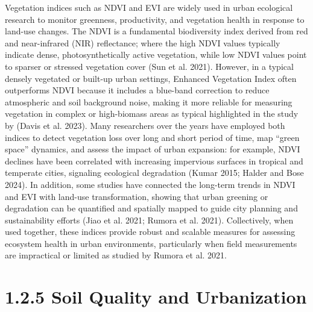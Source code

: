Vegetation indices such as NDVI and EVI are widely used in urban ecological research to monitor greenness, productivity, and vegetation health in response to land-use changes. The NDVI is a fundamental biodiversity index derived from red and near-infrared (NIR) reflectance; where the high NDVI values typically indicate dense, photosynthetically active vegetation, while low NDVI values point to sparser or stressed vegetation cover (Sun et al. 2021). However, in a typical densely vegetated or built-up urban settings, Enhanced Vegetation Index often outperforms NDVI because it includes a blue-band correction to reduce atmospheric and soil background noise, making it more reliable for measuring vegetation in complex or high-biomass areas as typical highlighted in the study by (Davis et al. 2023). Many researchers over the years have employed both indices to detect vegetation loss over long and short period of time, map ``green space'' dynamics, and assess the impact of urban expansion: for example, NDVI declines have been correlated with increasing impervious surfaces in tropical and temperate cities, signaling ecological degradation (Kumar 2015; Halder and Bose 2024). In addition, some studies have connected the long-term trends in NDVI and EVI with land-use transformation, showing that urban greening or degradation can be quantified and spatially mapped to guide city planning and sustainability efforts (Jiao et al. 2021; Rumora et al. 2021). Collectively, when used together, these indices provide robust and scalable measures for assessing ecosystem health in urban environments, particularly when field measurements are impractical or limited as studied by Rumora et al. 2021.
\hypertarget{soil-quality-and-urbanization}{%
\section{\texorpdfstring{\textbf{1.2.5 Soil Quality and Urbanization}}{1.2.5 Soil Quality and Urbanization}}\label{soil-quality-and-urbanization}}

